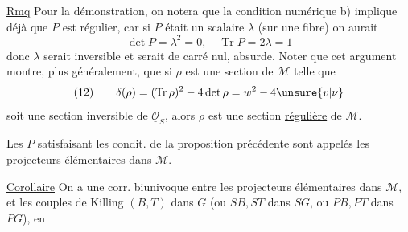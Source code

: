 
\uline{Rmq}  Pour la démonstration, on notera que la condition numérique b) implique déjà que $P$ est régulier, car si $P$ était un scalaire $\lambda$ (sur une fibre) on aurait
\[
\det P=\lambda^2=0,\quad\operatorname{Tr}P=2\lambda=1
\]
donc $\lambda$ serait inversible et serait de carré nul, absurde. Noter que cet argument montre, plus généralement, que si $\rho$ est une section de $\mathcal M$ telle que
\[
(12)\qquad \delta(\rho)=(\operatorname{Tr}\rho)^2-4\det\rho=w^2-4\unsure{v|\nu}
\]
soit une section inversible de $\underline{\mathcal O}_S$, alors $\rho$ est une section \uline{régulière} de $\mathcal M$.

 Les $P$  satisfaisant les condit. de la proposition précédente sont appelés les \uline{projecteurs élémentaires} dans $\mathcal M$. 

\uline{Corollaire} On a une corr. biunivoque entre les projecteurs élémentaires dans $\mathcal M$, et les couples de Killing $(B,T)$ dans $G$ (ou $SB,ST$ dans $SG$, ou $PB,PT$ dans $PG$), en



